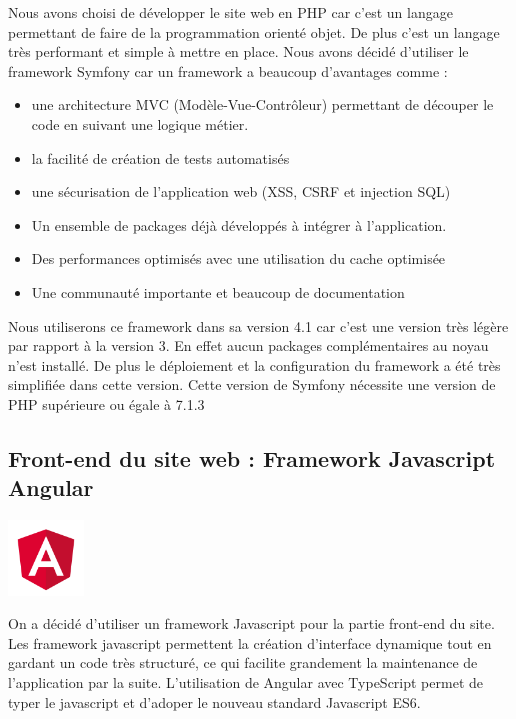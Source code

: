 \documentclass[12pt,a4paper]{article}
\begin{document}
Nous avons choisi de développer le site web en PHP car c'est un langage permettant de faire de la programmation orienté objet. 
De plus c'est un langage très performant et simple à mettre en place.
Nous avons décidé d'utiliser le framework Symfony car un framework a beaucoup d'avantages comme :
\begin{itemize}  
  \item une architecture MVC (Modèle-Vue-Contrôleur) permettant de découper le code en suivant une logique métier.
  \item la facilité de création de tests automatisés
  \item une sécurisation de l'application web (XSS, CSRF et injection SQL)
  \item Un ensemble de packages déjà développés à intégrer à l'application.
  \item Des performances optimisés avec une utilisation du cache optimisée
  \item Une communauté importante et beaucoup de documentation
\end{itemize}

\smallbreak

Nous utiliserons ce framework dans sa version 4.1 car c'est une version très légère par rapport à la version 3. 
En effet aucun packages complémentaires au noyau n'est installé. De plus le déploiement et la configuration du framework a été très simplifiée dans cette version.
Cette version de Symfony nécessite une version de PHP supérieure ou égale à 7.1.3

\subsection{Front-end du site web : Framework Javascript Angular}
\begin{center}
  \includegraphics[width=2cm]{img/angular.png}
\end{center}
On a décidé d'utiliser un framework Javascript pour la partie front-end du site.
Les framework javascript permettent la création d'interface dynamique tout en gardant un code très structuré, ce qui facilite grandement la maintenance de l'application par la suite.
L'utilisation de Angular avec TypeScript permet de typer le javascript et d'adoper le nouveau standard Javascript ES6.
\end{document}

